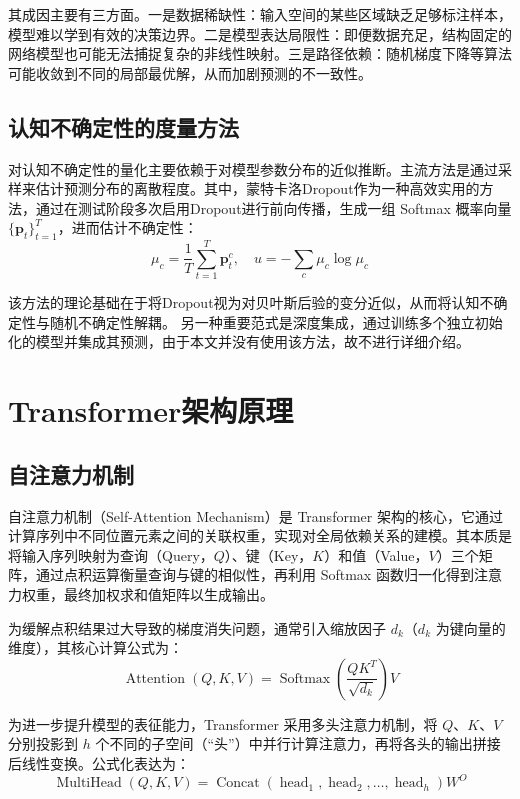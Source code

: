\documentclass{xduugthesis}
\begin{document}
其成因主要有三方面。一是数据稀缺性：输入空间的某些区域缺乏足够标注样本，模型难以学到有效的决策边界。二是模型表达局限性：即便数据充足，结构固定的网络模型也可能无法捕捉复杂的非线性映射。三是路径依赖：随机梯度下降等算法可能收敛到不同的局部最优解，从而加剧预测的不一致性。

\subsection{认知不确定性的度量方法}
对认知不确定性的量化主要依赖于对模型参数分布的近似推断。主流方法是通过采样来估计预测分布的离散程度。其中，蒙特卡洛Dropout作为一种高效实用的方法，通过在测试阶段多次启用Dropout进行前向传播，生成一组 Softmax 概率向量 $\{\mathbf{p}_t\}_{t=1}^T$，进而估计不确定性：
$$
\mu_c = \frac{1}{T} \sum_{t=1}^T \mathbf{p}_t^c, \quad u = -\sum_{c} \mu_c \log \mu_c
$$

该方法的理论基础在于将Dropout视为对贝叶斯后验的变分近似，从而将认知不确定性与随机不确定性解耦。
另一种重要范式是深度集成，通过训练多个独立初始化的模型并集成其预测，由于本文并没有使用该方法，故不进行详细介绍。

\section{Transformer架构原理}

\subsection{自注意力机制}

自注意力机制（Self-Attention Mechanism）是 Transformer 架构的核心，它通过计算序列中不同位置元素之间的关联权重，实现对全局依赖关系的建模。其本质是将输入序列映射为查询（Query，$Q$）、键（Key，$K$）和值（Value，$V$）三个矩阵，通过点积运算衡量查询与键的相似性，再利用 Softmax 函数归一化得到注意力权重，最终加权求和值矩阵以生成输出。

为缓解点积结果过大导致的梯度消失问题，通常引入缩放因子 $d_k$（$d_k$ 为键向量的维度），其核心计算公式为：
\begin{equation}
\operatorname{Attention}(Q, K, V) = \operatorname{Softmax}\left(\frac{QK^{T}}{\sqrt{d_{k}}}\right) V
\end{equation}

为进一步提升模型的表征能力，Transformer 采用多头注意力机制，将 $Q$、$K$、$V$ 分别投影到 $h$ 个不同的子空间（“头”）中并行计算注意力，再将各头的输出拼接后线性变换。公式化表达为：
\begin{equation}
\operatorname{MultiHead}(Q, K, V) = \operatorname{Concat}(\operatorname{head}_{1}, \operatorname{head}_{2}, \dots, \operatorname{head}_{h}) W^{O}
\end{equation}
\end{document}
